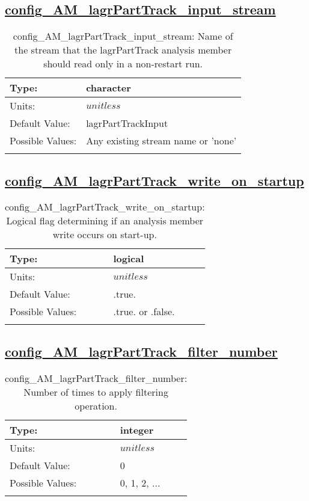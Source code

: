 \subsection[config\_AM\_lagrPartTrack\_input\_stream]{\hyperref[sec:nm_tab_AM_lagrPartTrack]{config\_AM\_lagrPartTrack\_input\_stream}}
\label{subsec:nm_sec_config_AM_lagrPartTrack_input_stream}
\begin{center}
\begin{longtable}{| p{2.0in} || p{4.0in} |}
    \hline
    Type: & character \\
    \hline
    Units: & $unitless$ \\
    \hline
    Default Value: & lagrPartTrackInput \\
    \hline
    Possible Values: & Any existing stream name or 'none' \\
    \hline
    \caption{config\_AM\_lagrPartTrack\_input\_stream: Name of the stream that the lagrPartTrack analysis member should read only in a non-restart run.}
\end{longtable}
\end{center}
\subsection[config\_AM\_lagrPartTrack\_write\_on\_startup]{\hyperref[sec:nm_tab_AM_lagrPartTrack]{config\_AM\_lagrPartTrack\_write\_on\_startup}}
\label{subsec:nm_sec_config_AM_lagrPartTrack_write_on_startup}
\begin{center}
\begin{longtable}{| p{2.0in} || p{4.0in} |}
    \hline
    Type: & logical \\
    \hline
    Units: & $unitless$ \\
    \hline
    Default Value: & .true. \\
    \hline
    Possible Values: & .true. or .false. \\
    \hline
    \caption{config\_AM\_lagrPartTrack\_write\_on\_startup: Logical flag determining if an analysis member write occurs on start-up.}
\end{longtable}
\end{center}
\subsection[config\_AM\_lagrPartTrack\_filter\_number]{\hyperref[sec:nm_tab_AM_lagrPartTrack]{config\_AM\_lagrPartTrack\_filter\_number}}
\label{subsec:nm_sec_config_AM_lagrPartTrack_filter_number}
\begin{center}
\begin{longtable}{| p{2.0in} || p{4.0in} |}
    \hline
    Type: & integer \\
    \hline
    Units: & $unitless$ \\
    \hline
    Default Value: & 0 \\
    \hline
    Possible Values: & 0, 1, 2, ... \\
    \hline
    \caption{config\_AM\_lagrPartTrack\_filter\_number: Number of times to apply filtering operation.}
\end{longtable}
\end{center}
